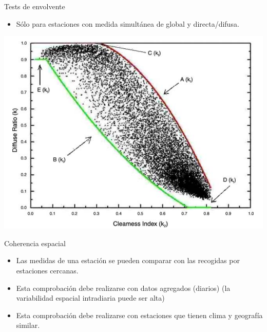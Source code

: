 \documentclass[xcolor={usenames,svgnames,dvipsnames}]{beamer}
\begin{document}
\begin{frame}[label={sec:org61c0594}]{Tests de envolvente}
\begin{itemize}
\item Sólo para estaciones con medida simultánea de global y directa/difusa.
\end{itemize}

\begin{center}
\includegraphics[width=.9\linewidth]{../figs/ConsistencyTest.png}
\end{center}

\nocite{Younes.Claywell.ea2005}
\end{frame}

\begin{frame}[label={sec:orgbea3808}]{Coherencia espacial}
\begin{itemize}
\item Las medidas de una estación se pueden comparar con las recogidas por estaciones cercanas.
\item Esta comprobación debe realizarse con \alert{datos agregados} (diarios) (la variabilidad espacial intradiaria puede ser alta)
\item Esta comprobación debe realizarse con estaciones que tienen \alert{clima y geografía similar}.
\end{itemize}

\nocite{Journee.Bertrand2011}
\end{frame}
\end{document}
